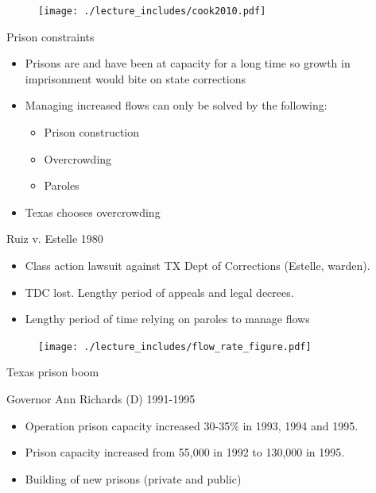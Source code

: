 \documentclass{beamer}
\begin{document}
\begin{frame}[plain]

\begin{figure}
\texttt{[image: ./lecture\_includes/cook2010.pdf]}
\end{figure}
\end{frame}


\begin{frame}{Prison constraints}

	
	\begin{itemize}
	\item Prisons are and have been at capacity for a long time so growth in imprisonment would bite on state corrections
	\item Managing increased flows can only be solved by the following:
		\begin{itemize}
		\item Prison construction
		\item Overcrowding
		\item Paroles
		\end{itemize}
	\item Texas chooses overcrowding
	\end{itemize}
\end{frame}



\begin{frame}{Ruiz v. Estelle 1980}

	
	\begin{itemize}
		\item Class action lawsuit against TX Dept of Corrections (Estelle, warden). 
		\item TDC lost.  Lengthy period of appeals and legal decrees.  
		\item Lengthy period of time relying on paroles to manage flows
	\end{itemize}
\end{frame}

\begin{frame}[shrink=30,plain]

\begin{figure}
\texttt{[image: ./lecture\_includes/flow\_rate\_figure.pdf]}
\end{figure}
\end{frame}



\begin{frame}{Texas prison boom}

Governor Ann Richards (D) 1991-1995
		\begin{itemize}
		\item Operation prison capacity increased 30-35\% in 1993, 1994 and 1995. 
		\item Prison capacity increased from 55,000 in 1992 to 130,000 in 1995.  
		\item Building of new prisons (private and public)
		\end{itemize} 
\end{frame}
\end{document}
